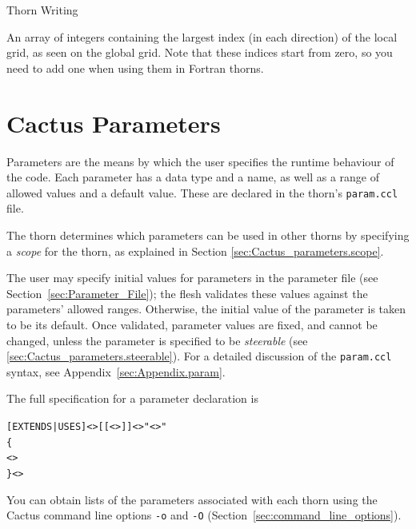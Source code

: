 \begin{cactuspart}{Thorn Writing}
\begin{Lentry}
\item [\texttt{CCTK\_Groupubnd[GN|GI|VN|VI]}]       An array of integers
      containing the largest index (in each direction)
      of the local grid, as seen on the global grid. Note that these indices
      start from zero, so you need to add one when using them in
      Fortran thorns.

\end{Lentry}


\section{Cactus Parameters}
\label{chap:Cactus_parameters}

Parameters are the means by which the user specifies the runtime behaviour of
the code.  Each parameter has a data type and a name, as well as a
range of allowed values and a default value.  These are declared in the thorn's
\texttt{param.ccl} file.

The thorn determines which parameters can be used in other thorns by
specifying a \textit{scope} for the thorn, as explained in Section
\ref{sec:Cactus_parameters.scope}.

The user may specify initial values for parameters in the parameter file
(see Section~\ref{sec:Parameter_File}); the flesh validates these values
against the parameters' allowed ranges.
Otherwise, the initial value of the parameter is taken to be its default.
Once validated, parameter values are fixed, and cannot be changed,
unless the parameter is specified to be \textit{steerable}
(see \ref{sec:Cactus_parameters.steerable}).
For a detailed discussion of the \texttt{param.ccl} syntax, see
Appendix~\ref{sec:Appendix.param}.

The full specification for a parameter declaration is
\begin{alltt}
[EXTENDS|USES] <>[[<>]] <> "<>"
\{
  <>
\} <>
\end{alltt}

You can obtain lists of the parameters associated with
each thorn using the Cactus command line options \texttt{-o} and \texttt{-O}
(Section~\ref{sec:command_line_options}).




\end{cactuspart}
